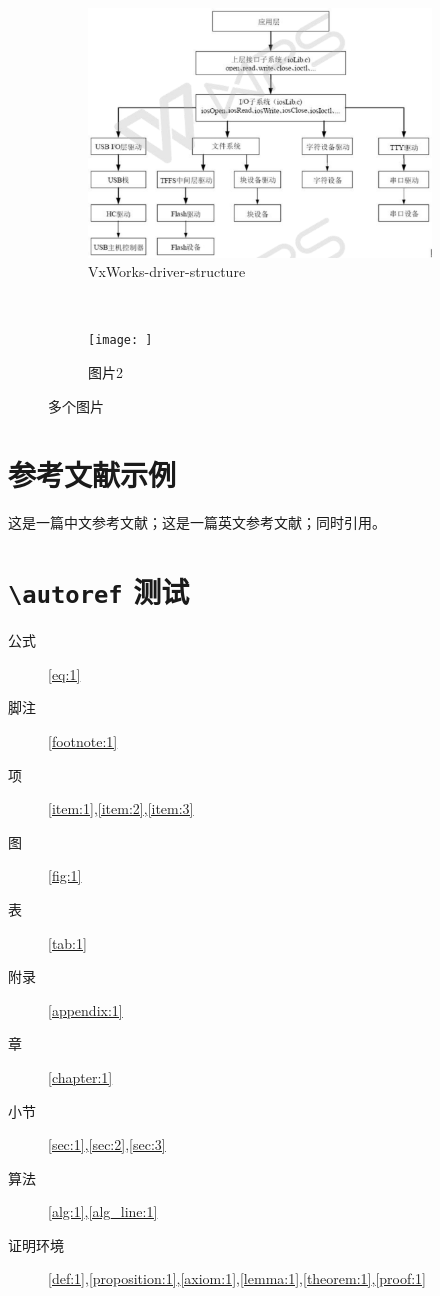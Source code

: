 {\begin{figure}[!h]
\centering
  \begin{subfigure}[b]{0.3\textwidth}
  \includegraphics[width=\textwidth]{./graphics/VxWorks-driver-structure.pdf}
  \caption{VxWorks-driver-structure}
  \end{subfigure}
  ~
  \begin{subfigure}[b]{0.3\textwidth}
  \texttt{[image: ]}
  \caption{图片2}\label{fig:2-2}
  \end{subfigure}
\caption{多个图片}\label{fig:2}
\end{figure}

\section{参考文献示例}
这是一篇中文参考文献\cite{徐媛媛2003嵌入式实时操作系统的设备驱动}；这是一篇英文参考文献\cite{9787508342894}；同时引用\cite{9780124467422,bamboosilk}。

\section[\textbackslash{}autoref 测试]{\texttt{\textbackslash{}autoref} 测试}

\begin{description}
  \item[公式] \autoref{eq:1}
  \item[脚注] \autoref{footnote:1}
  \item[项] \autoref{item:1},\autoref{item:2},\autoref{item:3}
  \item[图] \autoref{fig:1}
  \item[表] \autoref{tab:1}
  \item[附录] \autoref{appendix:1}
  \item[章] \autoref{chapter:1}
  \item[小节] \autoref{sec:1},\autoref{sec:2},\autoref{sec:3}
  \item[算法] \autoref{alg:1},\autoref{alg_line:1}
  \item[证明环境] \autoref{def:1},\autoref{proposition:1},\autoref{axiom:1},\autoref{lemma:1},\autoref{theorem:1},\autoref{proof:1}
\end{description}}